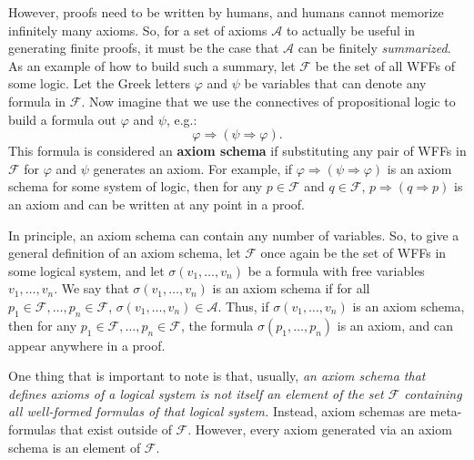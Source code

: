 \documentclass[11pt]{article}
\theoremstyle{definition}
\theoremstyle{remark}
\begin{document}
However, proofs need to be written by humans, and humans cannot memorize infinitely many axioms. So, for a set of axioms $\mathcal{A}$ to actually be useful in generating finite proofs, it must be the case that $\mathcal{A}$ can be finitely \textit{summarized}. As an example of how to build such a summary, let $\mathcal{F}$ be the set of all WFFs of some logic. Let the Greek letters $\varphi$ and $\psi$ be variables that can denote any formula in $\mathcal{F}$. Now imagine that we use the connectives of propositional logic to build a formula out $\varphi$ and $\psi$, e.g.:
$$\varphi\Rightarrow(\psi\Rightarrow\varphi).$$
This formula is considered an \textbf{axiom schema} if substituting any pair of WFFs in $\mathcal{F}$ for $\varphi$ and $\psi$ generates an axiom. For example, if $\varphi\Rightarrow(\psi\Rightarrow\varphi)$ is an axiom schema for some system of logic, then for any $p\in\mathcal{F}$ and $q\in\mathcal{F}$, $p\Rightarrow(q\Rightarrow p)$ is an axiom and can be written at any point in a proof.\par

In principle, an axiom schema can contain any number of variables. So, to give a general definition of an axiom schema, let $\mathcal{F}$ once again be the set of WFFs in some logical system, and let $\sigma(v_{1},\dots,v_{n})$ be a formula with free variables $v_{1},\dots,v_{n}$. We say that $\sigma(v_{1},\dots,v_{n})$ is an axiom schema if for all $p_{1}\in\mathcal{F},\dots,p_{n}\in\mathcal{F}$, $\sigma(v_{1},\dots,v_{n})\in\mathcal{A}$. Thus, if $\sigma(v_{1},\dots,v_{n})$ is an axiom schema, then for any $p_{1}\in\mathcal{F},\dots,p_{n}\in\mathcal{F}$, the formula $\sigma(p_{1},\dots,p_{n})$ is an axiom, and can appear anywhere in a proof.\par 

One thing that is important to note is that, usually, \textit{an axiom schema that defines axioms of a logical system is not itself an element of the set $\mathcal{F}$ containing all well-formed formulas of that logical system.} Instead, axiom schemas are meta-formulas that exist outside of $\mathcal{F}$. However, every axiom generated via an axiom schema is an element of $\mathcal{F}$.\par  
\end{document}
